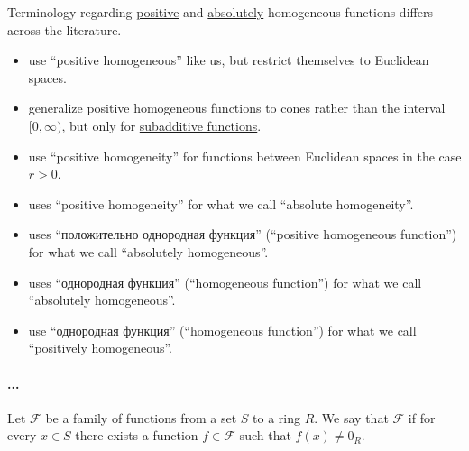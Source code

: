 \begin{remark}\label{rem:positive_homogeneous_function}
  Terminology regarding \hyperref[def:real_homogeneous_function/positive]{positive} and \hyperref[def:real_homogeneous_function/absolute]{absolutely} homogeneous functions differs across the literature.
  \begin{itemize}
    \item {} use \enquote{positive homogeneous} like us, but restrict themselves to Euclidean spaces.

    \item {} generalize positive homogeneous functions to cones rather than the interval \( [0, \infty) \), but only for \hyperref[def:additive_function/sub]{subadditive functions}.

    \item {} use \enquote{positive homogeneity} for functions between Euclidean spaces in the case \( r > 0 \).

    \item {} uses \enquote{positive homogeneity} for what we call \enquote{absolute homogeneity}.

    \item {} uses \enquote{положительно однородная функция} (\enquote{positive homogeneous function}) for what we call \enquote{absolutely homogeneous}.

    \item {} uses \enquote{однородная функция} (\enquote{homogeneous function}) for what we call \enquote{absolutely homogeneous}.

    \item {} use \enquote{однородная функция} (\enquote{homogeneous function}) for what we call \enquote{positively homogeneous}.
  \end{itemize}
\end{remark}

\paragraph{...}

\begin{definition}\label{def:functions_vanish_nowhere}
  Let \( \mathcal{F} \) be a family of functions from a set \( S \) to a ring \( R \). We say that \( \mathcal{F} \)  if for every \( x \in S \) there exists a function \( f \in \mathcal{F} \) such that \( f(x) \neq 0_R \).
\end{definition}

